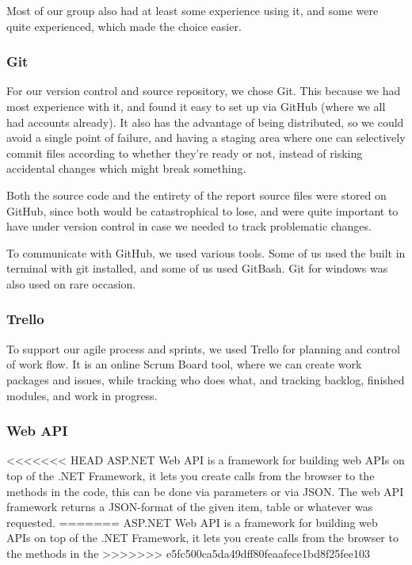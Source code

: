 Most of our group also had at least some experience using it, and some were quite experienced, which made the choice easier.

\subsubsection{Git}
For our version control and source repository, we chose Git. This because we had most experience with it, and found it easy to set up via GitHub (where we all had accounts already). It also has the advantage of being distributed, so we could avoid a single point of failure, and having a staging area where one can selectively commit files according to whether they're ready or not, instead of risking accidental changes which might break something.

Both the source code and the entirety of the report source files were stored on GitHub, since both would be catastrophical to lose, and were quite important to have under version control in case we needed to track problematic changes.

To communicate with GitHub, we used various tools. Some of us used the built in terminal with git installed, and some of us used GitBash. Git for windows was also used on rare occasion.

\subsubsection{Trello}\label{Trello}
To support our agile process and sprints, we used Trello for planning and control of work flow. It is an online Scrum Board tool, where we can create work packages and issues, while tracking who does what, and tracking backlog, finished modules, and work in progress.



\subsubsection{Web API}
<<<<<<< HEAD
ASP.NET Web API is a framework for building web APIs on top of the .NET Framework, it lets you create calls from the browser to the methods in the code, this can be done via parameters or via JSON. The web API framework returns a JSON-format of the given item, table or whatever was requested.
=======
ASP.NET Web API is a framework for building web APIs on top of the .NET Framework, it lets you create calls from the browser to the methods in the %
>>>>>>> e5fc500ca5da49dff80feaafece1bd8f25fee103

